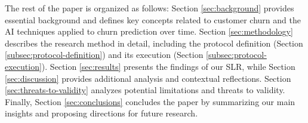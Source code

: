 The rest of the paper is organized as follows: Section \ref{sec:background} provides essential background and defines key concepts related to customer churn and the AI techniques applied to churn prediction over time. 
Section \ref{sec:methodology} describes the research method in detail, including the protocol definition (Section \ref{subsec:protocol-definition}) and its execution (Section \ref{subsec:protocol-execution}).
Section \ref{sec:results} presents the findings of our SLR, while Section \ref{sec:discussion} provides additional analysis and contextual reflections. 
Section  \ref{sec:threats-to-validity} analyzes potential limitations and threats to validity.
Finally, Section \ref{sec:conclusions} concludes the paper by summarizing our main insights and proposing directions for future research. 

%